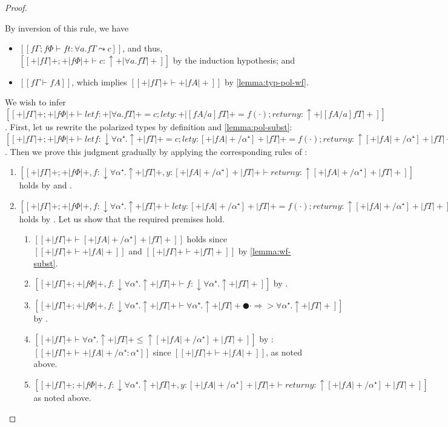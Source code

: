 \begin{proof}
\begin{caseof}
    \item {}
      By inversion of this rule, we have
      \begin{itemize}
        \item $[[fΓ ; fΦ ⊢ ft : ∀a.fT  ⤳  c]]$, and thus, 
          $[[+|fΓ|+ ; +|fΦ|+ ⊢ c : ↑+|∀a.fT|+]]$ by the induction hypothesis; and
        \item $[[fΓ ⊢ fA]]$, which implies $[[+|fΓ|+ ⊢ +|fA|+]]$ by \cref{lemma:typ-pol-wf}.
      \end{itemize}
      We wish to infer
      $[[+|fΓ|+ ; +|fΦ|+ ⊢ let f : +|∀a.fT|+ = c; let y : +|[fA/a]fT|+ = f(·); return y : ↑+|[fA/a]fT|+]]$.
      First, let us rewrite the polarized types by definition and \cref{lemma:pol-subst}:
      $[[+|fΓ|+ ; +|fΦ|+ ⊢ let f : ↓∀α⁺.↑+|fT|+ = c; let y : [+|fA|+/α⁺]+|fT|+ = f(·); return y : ↑[+|fA|+/α⁺]+|fT|+]]$.
      Then we prove this judgment gradually by applying the corresponding rules of \fexists:
      \begin{enumerate}
        \item $[[+|fΓ|+ ; +|fΦ|+, f : ↓∀α⁺.↑+|fT|+, y : [+|fA|+/α⁺]+|fT|+ ⊢ return y : ↑[+|fA|+/α⁺]+|fT|+]]$
          holds by  and .
        \item $[[+|fΓ|+ ; +|fΦ|+, f : ↓∀α⁺.↑+|fT|+  ⊢ let y : [+|fA|+/α⁺]+|fT|+ = f(·); return y : ↑[+|fA|+/α⁺]+|fT|+]]$
          holds by . Let us show that the 
          required premises hold. 
          \begin{enumerate}
            \item $[[+|fΓ|+ ⊢ [+|fA|+/α⁺]+|fT|+]]$ holds since $[[+|fΓ|+ ⊢ +|fA|+]]$ and $[[+|fΓ|+ ⊢ +|fT|+]]$ by \cref{lemma:wf-subst}.
            \item $[[+|fΓ|+ ; +|fΦ|+, f : ↓∀α⁺.↑+|fT|+  ⊢ f : ↓∀α⁺.↑+|fT|+]]$ by .
            \item $[[+|fΓ|+ ; +|fΦ|+, f : ↓∀α⁺.↑+|fT|+  ⊢ ∀α⁺.↑+|fT|+ ● · ⇒> ∀α⁺.↑+|fT|+]]$ by .
            \item $[[+|fΓ|+  ⊢ ∀α⁺.↑+|fT|+ ≤ ↑[+|fA|+/α⁺]+|fT|+ ]]$ by :
              $[[+|fΓ|+  ⊢ +|fA|+/α⁺ : {α⁺}]]$ since $[[+|fΓ|+  ⊢ +|fA|+]]$, as noted above.
            \item $[[+|fΓ|+ ; +|fΦ|+, f : ↓∀α⁺.↑+|fT|+, y : [+|fA|+/α⁺]+|fT|+ ⊢ return y : ↑[+|fA|+/α⁺]+|fT|+]]$ as noted above.
          \end{enumerate}

\end{enumerate}
\end{caseof}
\end{proof}
